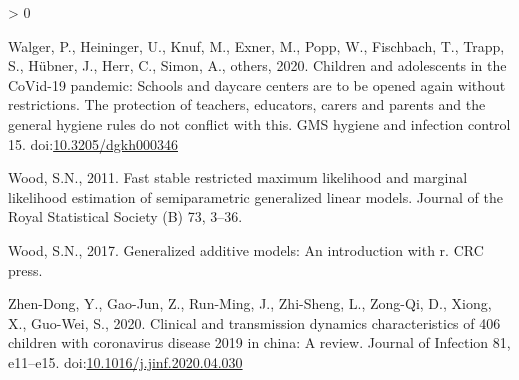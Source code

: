\documentclass[]{elsarticle} %
\newlength{\cslhangindent}
\newenvironment{CSLReferences}[2] %
 {%
  \setlength{\parindent}{0pt}
  \ifodd #1 \everypar{\setlength{\hangindent}{\cslhangindent}}\ignorespaces\fi
  \ifnum #2 > 0
  \setlength{\parskip}{#2\baselineskip}
  \fi
 }%
 {}
\begin{document}
\begin{CSLReferences}{1}{0}
\leavevmode\hypertarget{ref-walger2020children}{}%
Walger, P., Heininger, U., Knuf, M., Exner, M., Popp, W., Fischbach, T., Trapp, S., Hübner, J., Herr, C., Simon, A., others, 2020. Children and adolescents in the CoVid-19 pandemic: Schools and daycare centers are to be opened again without restrictions. The protection of teachers, educators, carers and parents and the general hygiene rules do not conflict with this. GMS hygiene and infection control 15. doi:\href{https://doi.org/10.3205/dgkh000346}{10.3205/dgkh000346}

\leavevmode\hypertarget{ref-wood2011fast}{}%
Wood, S.N., 2011. Fast stable restricted maximum likelihood and marginal likelihood estimation of semiparametric generalized linear models. Journal of the Royal Statistical Society (B) 73, 3--36.

\leavevmode\hypertarget{ref-wood2017generalized}{}%
Wood, S.N., 2017. Generalized additive models: An introduction with r. CRC press.

\leavevmode\hypertarget{ref-zhendong2020clinical}{}%
Zhen-Dong, Y., Gao-Jun, Z., Run-Ming, J., Zhi-Sheng, L., Zong-Qi, D., Xiong, X., Guo-Wei, S., 2020. Clinical and transmission dynamics characteristics of 406 children with coronavirus disease 2019 in china: A review. Journal of Infection 81, e11--e15. doi:\href{https://doi.org/10.1016/j.jinf.2020.04.030}{10.1016/j.jinf.2020.04.030}

\end{CSLReferences}
\end{document}
